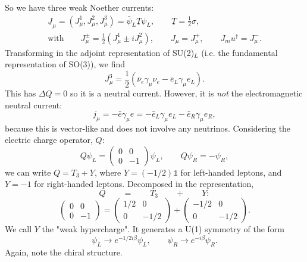 So we have three weak Noether currents:
\begin{equation}
\begin{split}
\underline{J}_\mu = (J_\mu^1, J_\mu^2, J_\mu^3) = \bar{\psi}_L \underline{T} \psi_L, \qquad \underline{T} = \frac{1}{2}\sigma, \\
\text{with} \qquad J_\mu^\pm = \frac{1}{2}(J_\mu^1 \pm iJ_\mu^2), \qquad J_\mu = J_\mu^+, \qquad J_mu^\dagger = J_\mu^-.
\end{split}
\end{equation}
Transforming in the adjoint representation of SU(2)$_L$ (i.e. the fundamental representation of SO(3)), we find
\begin{equation}
J_\mu^3 = \frac{1}{2}(\bar{\nu}_e \gamma_\mu \nu_e - \bar{e}_L \gamma_\mu e_L).
\end{equation}
This has $\Delta Q =0$ so it is a neutral current. However, it is \textit{not} the electromagnetic neutral current:
\begin{equation}
j_\mu = - \bar{e}\gamma_\mu e = - \bar{e}_L \gamma_\mu e_L - \bar{e}_R \gamma_\mu e_R,
\end{equation}
because this is vector-like and does not involve any neutrinos.
Considering the electric charge operator, $Q$:
\[ Q \psi_L = \left( \begin{array}{cc}
0 & 0  \\
0 & -1  \end{array} \right) \psi_L, \qquad
Q \psi_R = - \psi_R, \]
we can write $Q = T_3 + Y$, where $Y = (-1/2) \mathds{1}$ for left-handed leptons, and $Y = -1$ for right-handed leptons. Decomposed in the representation,
\[ Q \qquad = \qquad T_3 \qquad + \qquad Y: \]
\[\left( \begin{array}{cc}
0 & 0  \\
0 & -1  \end{array} \right)=
\left( \begin{array}{cc}
1/2 & 0  \\
0 & -1/2  \end{array} \right) +
\left( \begin{array}{cc}
-1/2 & 0  \\
0 & -1/2  \end{array} \right). \]
We call $Y$ the "weak hypercharge". It generates a U(1) symmetry of the form
\begin{equation}
\psi_L \to e^{-1/2 i \beta}\psi_L,  \qquad \psi_R \to e^{-i \beta}  \psi_R.
\end{equation}
Again, note the chiral structure.

